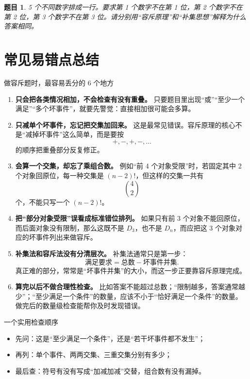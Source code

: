 \documentclass[11pt,a4paper,fontset=fandol]{ctexart}
\theoremstyle{formalexample}
\newtheorem{exercise}{题目}[section]
\begin{document}
\begin{exercise}
5 个不同数字排成一行。要求第 1 个数字不在第 1 位，第 2 个数字不在第 2 位，第 3 个数字不在第 3 位。请分别用“容斥原理”和“补集思想”解释为什么答案相同。
\end{exercise}

\newpage
\section{常见易错点总结}

\begin{goalbox}{做容斥题时，最容易丢分的 6 个地方}
\begin{enumerate}
  \item \textbf{只会把各类情况相加，不会检查有没有重叠。}  
  只要题目里出现“或”“至少一个满足”“多个坏事件”，就要先警觉：直接相加很可能会多算。

  \item \textbf{只减单个坏事件，忘记把交集加回来。}  
  这是最常见错误。容斥原理的核心不是“减掉坏事件”这么简单，而是要按
  \[
  +,-,+,-,\ldots
  \]
  的顺序把重叠部分反复修正。

  \item \textbf{会算一个交集，却忘了乘组合数。}  
  例如“前 4 个对象受限”时，若固定其中 2 个对象回原位，每一种交集是 $(n-2)!$，但这样的交集一共有
  \[
  \binom{4}{2}
  \]
  个，不能只写一个 $(n-2)!$。

  \item \textbf{把“部分对象受限”误看成标准错位排列。}  
  如果只有前 3 个对象不能回原位，而后面对象没有限制，那么这既不是 $D_3$，也不是 $D_n$，而应把这 3 个对象对应的坏事件列出来做容斥。

  \item \textbf{补集法和容斥法没有分清层次。}  
  补集法通常只是第一步：
  \[
  \text{满足要求}=\text{总数}-\text{坏事件并集}.
  \]
  真正难的部分，常常是“坏事件并集”的大小，而这一步正要靠容斥原理完成。

  \item \textbf{算完以后不做合理性检查。}  
  比如答案不能超过总数；“限制越多，答案通常越少”；“至少满足一个条件”的数量，应该不小于“恰好满足一个条件”的数量。做完后的数量级检查能帮你及时发现错误。
\end{enumerate}
\end{goalbox}

\begin{notebox}{一个实用检查顺序}
\begin{itemize}
  \item 先问：这是“至少满足一个条件”，还是“若干坏事件都不发生”；
  \item 再列：单个事件、两两交集、三重交集分别有多少；
  \item 最后查：符号有没有写成“加减加减”交替，组合数有没有漏掉。
\end{itemize}
\end{notebox}
\end{document}
